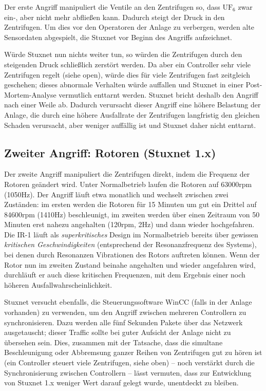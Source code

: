\documentclass[a4paper]{article}
\begin{document}
Der erste Angriff manipuliert die Ventile an den Zentrifugen so,
dass $\mathrm{UF}_6$ zwar ein-, aber nicht mehr abfließen kann.
Dadurch steigt der Druck in den Zentrifugen.
Um dies vor den Operatoren der Anlage zu verbergen,
werden alte Sensordaten abgespielt, die Stuxnet vor Beginn des Angriffs aufzeichnet.

Würde Stuxnet nun nichts weiter tun, so würden die Zentrifugen durch den steigenden Druck schließlich zerstört werden.
Da aber ein Controller sehr viele Zentrifugen regelt (siehe open), würde dies für viele Zentrifugen fast zeitgleich geschehen;
dieses abnormale Verhalten würde auffallen und Stuxnet in einer Post-Mortem-Analyse vermutlich enttarnt werden.
Stuxnet bricht deshalb den Angriff nach einer Weile ab.
Dadurch verursacht dieser Angriff eine höhere Belastung der Anlage,
die durch eine höhere Ausfallrate der Zentrifugen langfristig den gleichen Schaden verursacht,
aber weniger auffällig ist und Stuxnet daher nicht enttarnt.

\subsection{Zweiter Angriff: Rotoren (Stuxnet 1.x)}

Der zweite Angriff manipuliert die Zentrifugen direkt, indem die Frequenz der Rotoren geändert wird.
Unter Normalbetrieb laufen die Rotoren auf 63000rpm (1050Hz).
Der Angriff läuft etwa monatlich und wechselt zwischen zwei Zuständen:
im ersten werden die Rotoren für 15 Minuten um gut ein Drittel auf 84600rpm (1410Hz) beschleunigt,
im zweiten werden über einen Zeitraum von 50 Minuten erst nahezu angehalten (120rpm, 2Hz) und dann wieder hochgefahren.
Die IR-1 läuft als \emph{superkritisches} Design im Normalbetrieb bereits über gewissen \emph{kritischen Geschwindigkeiten}
(entsprechend der Resonanzfrequenz des Systems), bei denen durch Resonanzen Vibrationen des Rotors auftreten können.
Wenn der Rotor nun im zweiten Zustand beinahe angehalten und wieder angefahren wird,
durchläuft er auch diese kritischen Frequenzen, mit dem Ergebnis einer noch höheren Ausfallwahrscheinlichkeit.

Stuxnet versucht ebenfalls, die Steuerungssoftware WinCC (falls in der Anlage vorhanden) zu verwenden, um den Angriff zwischen mehreren Controllern zu synchronisieren.\cite{dossier} %
Dazu werden alle fünf Sekunden Pakete über das Netzwerk ausgetauscht; dieser Traffic sollte bei guter Aufsicht der Anlage nicht zu übersehen sein.
Dies, zusammen mit der Tatsache, dass die simultane Beschleunigung oder Abbremsung ganzer Reihen von Zentrifugen gut zu hören ist
(ein Controller steuert viele Zentrifugen, siehe oben) – noch verstärkt durch die Synchronisierung zwischen Controllern –
lässt vermuten, dass zur Entwicklung von Stuxnet 1.x weniger Wert darauf gelegt wurde, unentdeckt zu bleiben.
\end{document}

